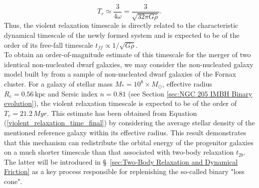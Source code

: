 \documentclass[12pt,twoside,openany]{book}
\begin{document}
\begin{equation}
T_r\simeq
\frac{3}{4\omega}=\frac{3}{\sqrt{32\pi G\bar{\rho}}}.
\label{violent_relaxation_time_final}
\end{equation}
Thus, the violent relaxation timescale is directly related to the characteristic dynamical timescale of the newly formed system and is expected to be of the order of its free-fall timescale $t_{ff}\propto 1/\sqrt{G\bar{\rho}}$.\\To obtain an order-of-magnitude estimate of this timescale for the merger of two identical non-nucleated dwarf galaxies, we may consider the non-nucleated galaxy model built by \textcite{Khan_2024} from a sample of non-nucleated dwarf galaxies of the Fornax cluster. For a galaxy of stellar mass $M_*=10^8\times M_\odot$, effective radius $R_e=0.56\,\mathrm{kpc}$ and Sersic index $n=0.81$ (see Section \ref{sec:NGC 205 IMBH Binary evolution}), the violent relaxation timescale is expected to be of the order of $T_r=21.2\,Myr$. This estimate has been obtained from Equation (\ref{violent_relaxation_time_final}) by considering the average stellar density of the mentioned reference galaxy within its effective radius. This result demonstrates that this mechanism can redistribute the orbital energy of the progenitor galaxies on a much shorter timescale than that associated with two-body relaxation $t_{2b}$. The latter will be introduced in \S~\ref{sec:Two-Body Relaxation and Dynamical Friction} as a key process responsible for replenishing the so-called binary "loss cone".
\end{document}
